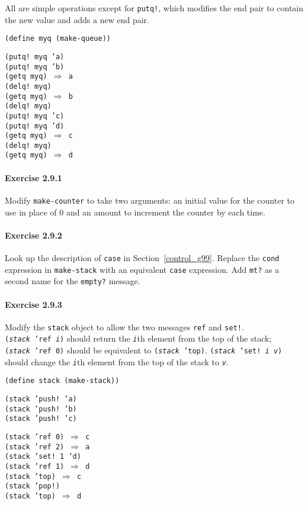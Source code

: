 All are simple operations except for \texttt{putq!}, which modifies the
end pair to contain the new value and adds a new end pair.


\begin{alltt}
(define myq (make-queue))

(putq! myq 'a)
(putq! myq 'b)
(getq myq) \(\Rightarrow\) a
(delq! myq)
(getq myq) \(\Rightarrow\) b
(delq! myq)
(putq! myq 'c)
(putq! myq 'd)
(getq myq) \(\Rightarrow\) c
(delq! myq)
(getq myq) \(\Rightarrow\) d
\end{alltt}

\paragraph{Exercise \label{start_g41}2.9.1}


\label{start_s186}Modify \label{start_s187}\texttt{make-counter} to take two
arguments: an initial value for the
counter to use in place of 0 and an amount to increment the counter
by each time.




\paragraph{Exercise \label{start_g42}2.9.2}


\label{start_s188}Look up the description of \label{start_s189}\texttt{case} in Section \ref{control_g99}.
Replace the \texttt{cond} expression in
\label{start_s190}\texttt{make-stack} with an equivalent
\texttt{case} expression.
Add \texttt{mt?} as a second name for the \texttt{empty?} message.




\paragraph{Exercise \label{start_g43}2.9.3}


\label{start_s191}\label{start_EXSTACKREFANDSET}Modify the \texttt{stack} object to allow the two messages \texttt{ref} and
\texttt{set!}.
\texttt{(\textit{stack} 'ref \textit{i})} should return the \texttt{\textit{i}}th element from
the top of the stack; \texttt{(\textit{stack} 'ref 0)} should be equivalent
to \texttt{(\textit{stack} 'top)}.
\texttt{(\textit{stack} 'set! \textit{i} \textit{v})} should change the \texttt{\textit{i}}th
element from the top of the stack to \texttt{\textit{v}}.


\begin{alltt}
(define stack (make-stack))

(stack 'push! 'a)
(stack 'push! 'b)
(stack 'push! 'c)

(stack 'ref 0) \(\Rightarrow\) c
(stack 'ref 2) \(\Rightarrow\) a
(stack 'set! 1 'd)
(stack 'ref 1) \(\Rightarrow\) d
(stack 'top) \(\Rightarrow\) c
(stack 'pop!)
(stack 'top) \(\Rightarrow\) d
\end{alltt}


